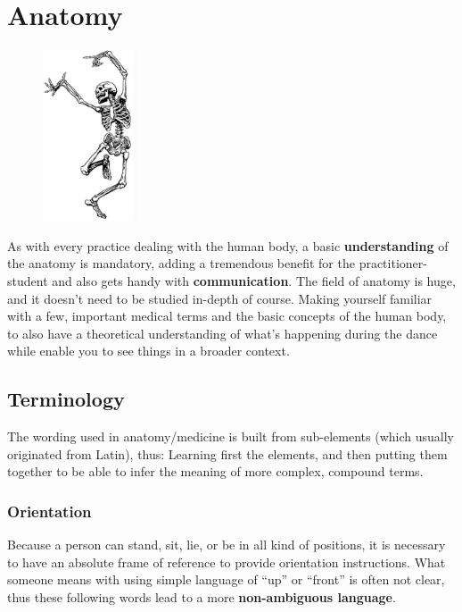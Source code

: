 \chapter{Anatomy}\label{ch:anatomy}

\begin{figure}
    \centering
    \includegraphics[width=0.25\textwidth]{images/anatomy}
\end{figure}

As with every practice dealing with the human body, a basic \textbf{understanding} of the anatomy is mandatory, adding a tremendous benefit for the practitioner-student and also gets handy with \textbf{communication}.
The field of anatomy is huge, and it doesn't need to be studied in-depth of course.
Making yourself familiar with a few, important medical terms and the basic concepts of the human body, to also have a theoretical understanding of what's happening during the dance while enable you to see things in a broader context.

\section{Terminology}\label{sec:terminology}

The wording used in anatomy/medicine is built from sub-elements (which usually originated from Latin), thus:
Learning first the elements, and then putting them together to be able to infer the meaning of more complex, compound terms.

\subsection{Orientation}

Because a person can stand, sit, lie, or be in all kind of positions, it is necessary to have an absolute frame of reference to provide orientation instructions.
What someone means with using simple language of ``up'' or ``front'' is often not clear, thus these following words lead to a more \textbf{non-ambiguous language}.

